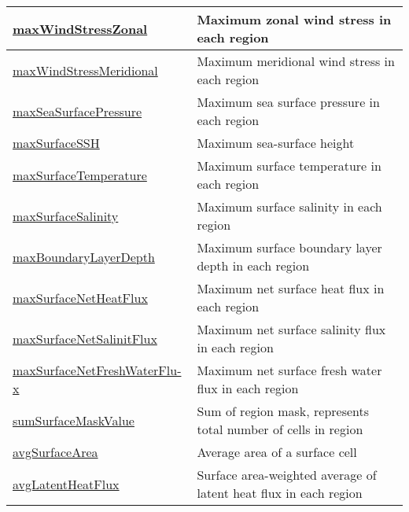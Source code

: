 {\begin{center}
\begin{longtable}{| p{2.0in} | p{4.0in} |}
    \hline
    \hyperref[subsec:var_sec_surfaceAreaWeightedAveragesAM_maxWindStressZonal]{maxWindStressZonal} & Maximum zonal wind stress in each region \\
    \hline
    \hyperref[subsec:var_sec_surfaceAreaWeightedAveragesAM_maxWindStressMeridional]{maxWindStressMeridional} & Maximum meridional wind stress in each region \\
    \hline
    \hyperref[subsec:var_sec_surfaceAreaWeightedAveragesAM_maxSeaSurfacePressure]{maxSeaSurfacePressure} & Maximum sea surface pressure in each region \\
    \hline
    \hyperref[subsec:var_sec_surfaceAreaWeightedAveragesAM_maxSurfaceSSH]{maxSurfaceSSH} & Maximum sea-surface height \\
    \hline
    \hyperref[subsec:var_sec_surfaceAreaWeightedAveragesAM_maxSurfaceTemperature]{maxSurfaceTemperature} & Maximum surface temperature in each region \\
    \hline
    \hyperref[subsec:var_sec_surfaceAreaWeightedAveragesAM_maxSurfaceSalinity]{maxSurfaceSalinity} & Maximum surface salinity in each region \\
    \hline
    \hyperref[subsec:var_sec_surfaceAreaWeightedAveragesAM_maxBoundaryLayerDepth]{maxBoundaryLayerDepth} & Maximum surface boundary layer depth in each region \\
    \hline
    \hyperref[subsec:var_sec_surfaceAreaWeightedAveragesAM_maxSurfaceNetHeatFlux]{maxSurfaceNetHeatFlux} & Maximum net surface heat flux in each region \\
    \hline
    \hyperref[subsec:var_sec_surfaceAreaWeightedAveragesAM_maxSurfaceNetSalinitFlux]{maxSurfaceNetSalinitFlux} & Maximum net surface salinity flux in each region \\
    \hline
    \hyperref[subsec:var_sec_surfaceAreaWeightedAveragesAM_maxSurfaceNetFreshWaterFlux]{maxSurfaceNetFreshWaterFlu-}\hyperref[subsec:var_sec_surfaceAreaWeightedAveragesAM_maxSurfaceNetFreshWaterFlux]{x}  & Maximum net surface fresh water flux in each region \\
    \hline
    \hyperref[subsec:var_sec_surfaceAreaWeightedAveragesAM_sumSurfaceMaskValue]{sumSurfaceMaskValue} & Sum of region mask, represents total number of cells in region \\
    \hline
    \hyperref[subsec:var_sec_surfaceAreaWeightedAveragesAM_avgSurfaceArea]{avgSurfaceArea} & Average area of a surface cell \\
    \hline
    \hyperref[subsec:var_sec_surfaceAreaWeightedAveragesAM_avgLatentHeatFlux]{avgLatentHeatFlux} & Surface area-weighted average of latent heat flux in each region \\

\end{longtable}
\end{center}}
